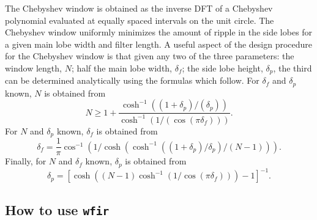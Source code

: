 	The Chebyshev window
is obtained as the inverse DFT of
a Chebyshev polynomial evaluated at equally spaced intervals
on the unit circle.  The Chebyshev window uniformly minimizes the amount
of ripple in the side lobes for a given main lobe width and filter
length.  A useful aspect of the design procedure for the Chebyshev
window is that given any two of the three parameters: the
window length, $N$; half the main lobe width, $\delta_f$; the side lobe
height, $\delta_p$, the third can be determined analytically using the formulas
which follow.	For $\delta_f$ and $\delta_p$ known, $N$ is obtained from
%
\begin{equation}
N \ge  1+\frac{\cosh^{-1}((1+\delta_p)/(\delta_p))}{\cosh^{-1}(1/(\cos(\pi\delta_f)))}.
\label{e17}
\end{equation}
%
For $N$ and $\delta_p$ known, $\delta_f$ is obtained from
%
\begin{equation}
\delta_f=\frac{1}{\pi}\cos^{-1}(1/\cosh(\cosh^{-1}((1+\delta_p)/\delta_p)/(N-1))).
\label{e18}
\end{equation}
%
Finally, for $N$ and $\delta_f$ known, $\delta_p$ is obtained from
%
\begin{equation}
\delta_p=[\cosh((N-1)\cosh^{-1}(1/\cos(\pi\delta_f)))-1]^{-1}.
\label{e19}
\end{equation}
%
\subsection{How to use {\tt wfir}}
\label{s4}

